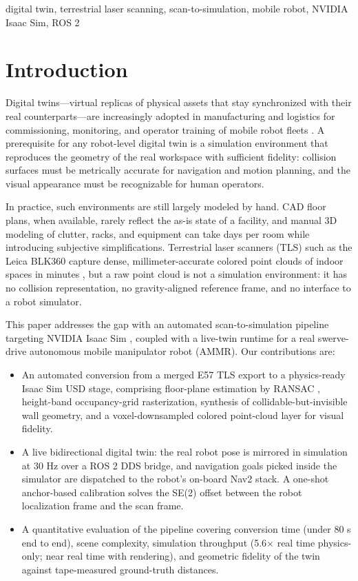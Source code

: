 \documentclass[conference]{IEEEtran}
\begin{document}
\begin{IEEEkeywords}
digital twin, terrestrial laser scanning, scan-to-simulation,
mobile robot, NVIDIA Isaac Sim, ROS 2
\end{IEEEkeywords}

\section{Introduction}
Digital twins---virtual replicas of physical assets that stay
synchronized with their real counterparts---are increasingly adopted in
manufacturing and logistics for commissioning, monitoring, and operator
training of mobile robot fleets \cite{tao2019}. A prerequisite for any
robot-level digital twin is a simulation environment that reproduces the
geometry of the real workspace with sufficient fidelity: collision
surfaces must be metrically accurate for navigation and motion planning,
and the visual appearance must be recognizable for human operators.

In practice, such environments are still largely modeled by hand. CAD
floor plans, when available, rarely reflect the as-is state of a
facility, and manual 3D modeling of clutter, racks, and equipment can
take days per room while introducing subjective simplifications.
Terrestrial laser scanners (TLS) such as the Leica BLK360 capture
dense, millimeter-accurate colored point clouds of indoor spaces in
minutes \cite{blk360}, but a raw point cloud is not a simulation
environment: it has no collision representation, no gravity-aligned
reference frame, and no interface to a robot simulator.

This paper addresses the gap with an automated scan-to-simulation
pipeline targeting NVIDIA Isaac Sim \cite{isaacsim}, coupled with a
live-twin runtime for a real swerve-drive autonomous mobile manipulator
robot (AMMR). Our contributions are:
\begin{itemize}
\item An automated conversion from a merged E57 TLS export to a
physics-ready Isaac Sim USD stage, comprising floor-plane estimation by
RANSAC \cite{ransac}, height-band occupancy-grid rasterization,
synthesis of collidable-but-invisible wall geometry, and a
voxel-downsampled colored point-cloud layer for visual fidelity.
\item A live bidirectional digital twin: the real robot pose is
mirrored in simulation at 30 Hz over a ROS 2 \cite{ros2} DDS bridge,
and navigation goals picked inside the simulator are dispatched to the
robot's on-board Nav2 \cite{nav2} stack. A one-shot anchor-based
calibration solves the SE(2) offset between the robot localization
frame and the scan frame.
\item A quantitative evaluation of the pipeline covering conversion
time (under 80 s end to end), scene complexity, simulation throughput
(5.6$\times$ real time physics-only; near real time with rendering),
and geometric fidelity of the twin against tape-measured ground-truth
distances.
\end{itemize}
\end{document}
